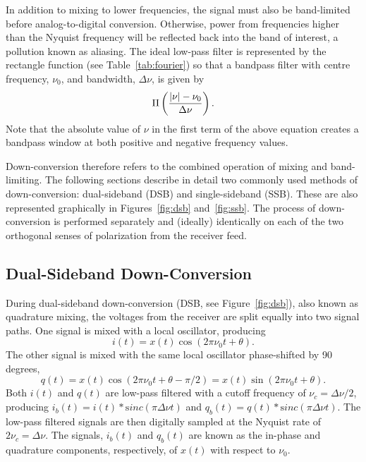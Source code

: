 \documentclass[twocolumn]{aastex6}
\newcommand{\Fig}[1]{Figure~\ref{fig:#1}}
\newcommand{\Tab}[1]{Table~\ref{tab:#1}}
\newcommand{\sinc}{\mathrm sinc}
\newcommand{\bw}{\ensuremath{ \Delta\nu }}
\begin{document}
\begin{appendix}
In addition to mixing to lower frequencies, the signal must also be
band-limited before analog-to-digital conversion.  Otherwise, power
from frequencies higher than the Nyquist frequency will be reflected
back into the band of interest, a pollution known as aliasing.  The
ideal low-pass filter is represented by the rectangle function (see
\Tab{fourier}) so that a bandpass filter with centre frequency,
$\nu_0$, and bandwidth, \bw, is given by
\begin{equation}
\Pi \left( {{|\nu|-\nu_0}\over\Delta\nu} \right).
\end{equation}
Note that the absolute value of $\nu$ in the first term of the above
equation creates a bandpass window at both positive and negative
frequency values.

Down-conversion therefore refers to the combined operation of mixing
and band-limiting.  The following sections describe in detail two
commonly used methods of down-conversion: dual-sideband (DSB) and
single-sideband (SSB).  These are also represented graphically in
Figures~\ref{fig:dsb} and~\ref{fig:ssb}.  The process of
down-conversion is performed separately and (ideally) identically on
each of the two orthogonal senses of polarization from the receiver
feed.

\subsection{Dual-Sideband Down-Conversion}
\label{app:dsb}

During dual-sideband down-conversion (DSB, see \Fig{dsb}), also known
as quadrature mixing, the voltages from the receiver are split equally
into two signal paths.  One signal is mixed with a local oscillator,
producing
\[
	i(t)=x(t)\cos(2\pi\nu_0t+\theta).
\]
The other signal is mixed with the same local oscillator phase-shifted
by 90 degrees,
\[
q(t)=x(t)\cos(2\pi\nu_0t+\theta-\pi/2)=x(t)\sin(2\pi\nu_0t+\theta).
\]
Both $i(t)$ and $q(t)$ are low-pass filtered with a cutoff frequency
of $\nu_c=\Delta\nu/2$, producing $i_b(t)=i(t)*\sinc(\pi\Delta\nu
t)$ and $q_b(t)=q(t)*\sinc(\pi\Delta\nu t)$.  The low-pass
filtered signals are then digitally sampled at the Nyquist rate of
$2\nu_c=\Delta\nu$.  The signals, $i_b(t)$ and $q_b(t)$ are known as
the in-phase and quadrature components, respectively, of $x(t)$ with
respect to $\nu_0$.


\end{appendix}
\end{document}
